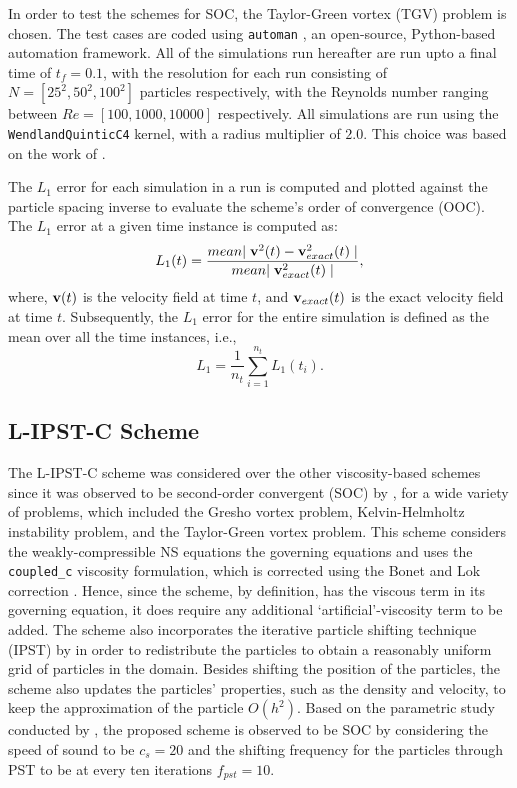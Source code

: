 In order to test the schemes for SOC, the Taylor-Green vortex (TGV) problem is chosen. The test cases are coded using \texttt{automan} \parencite{RamachandranAutoman2018}, an open-source, Python-based automation framework. All of the simulations run hereafter are run upto a final time of $t_f=0.1$, with the resolution for each run consisting of $N=[25^2, 50^2, 100^2]$ particles respectively, with the Reynolds number ranging between $Re=[100, 1000, 10000]$ respectively. All simulations are run using the \texttt{WendlandQuinticC4} kernel, with a radius multiplier of $2.0$. This choice was based on the work of \cite{Negi2022Techniques}.

The $L_1$ error for each simulation in a run is computed and plotted against the particle spacing inverse to evaluate the scheme's order of convergence (OOC). The $L_1$ error at a given time instance is computed as:
\begin{equation}
  L_1(t) = \frac{mean{\mid \mathbf{v}^2(t) - \mathbf{v}^2_{exact}(t) \mid}}{mean{\mid \mathbf{v}^2_{exact}(t) \mid}},
\end{equation}
where, $\mathbf{v}(t)$ is the velocity field at time $t$, and $\mathbf{v}_{exact}(t)$ is the exact velocity field at time $t$.
Subsequently, the $L_1$ error for the entire simulation is defined as the mean over all the time instances, i.e.,
\begin{equation}
  L_1 = \frac{1}{n_t} \sum_{i=1}^{n_t} L_1(t_i).
\end{equation}

\subsection{L-IPST-C Scheme}

The L-IPST-C scheme was considered over the other viscosity-based schemes since it was observed to be second-order convergent (SOC) by \cite{Negi2022Techniques}, for a wide variety of problems, which included the Gresho vortex problem, Kelvin-Helmholtz instability problem, and the Taylor-Green vortex problem. This scheme considers the weakly-compressible NS equations the governing equations and uses the \texttt{coupled\_c} viscosity formulation, which is corrected using the Bonet and Lok correction \parencite{bonet1999variational}. Hence, since the scheme, by definition, has the viscous term in its governing equation, it does require any additional `artificial'-viscosity term to be added.
The scheme also incorporates the iterative particle shifting technique (IPST) by \cite{Huang_Long_Li_Liu_2019} in order to redistribute the particles to obtain a reasonably uniform grid of particles in the domain. Besides shifting the position of the particles, the scheme also updates the particles' properties, such as the density and velocity, to keep the approximation of the particle $O(h^2)$.
Based on the parametric study conducted by \cite{Negi2022Techniques}, the proposed scheme is observed to be SOC by considering the speed of sound to be $c_s = 20$ and the shifting frequency for the particles through PST to be at every ten iterations $f_{pst} = 10$.

